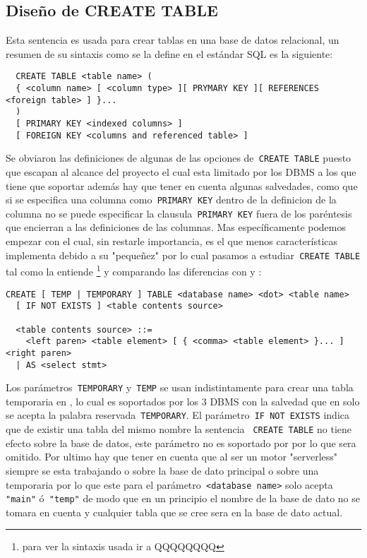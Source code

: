\subsection{Diseño de CREATE TABLE}
Esta sentencia es usada para crear tablas en una base de datos relacional, un resumen de su sintaxis como se la define en el estándar SQL es la siguiente:
\begin{Verbatim}
  CREATE TABLE <table name> (
  { <column name> [ <column type> ][ PRYMARY KEY ][ REFERENCES <foreign table> ] }...
  )
  [ PRIMARY KEY <indexed columns> ]
  [ FOREIGN KEY <columns and referenced table> ]
\end{Verbatim}
Se obviaron las definiciones de algunas de las opciones de\verb= CREATE TABLE= puesto que escapan al alcance del proyecto el cual esta limitado por los DBMS a los que tiene que soportar además hay que tener en cuenta algunas salvedades, como que si se especifica una columna como\verb= PRIMARY KEY= dentro de la definicion de la columna no se puede especificar la clausula\verb= PRIMARY KEY= fuera de los paréntesis que encierran a las definiciones de las columnas. Mas específicamente podemos empezar con \s el cual, sin restarle importancia, es el que menos características implementa debido a su "pequeñez" por lo cual pasamos a estudiar\verb= CREATE TABLE= tal como la entiende \s\footnote{para ver la sintaxis usada ir a QQQQQQQQ} y comparando las diferencias con \m y \p:

\begin{Verbatim}[frame=leftline, framesep=3mm]
  CREATE [ TEMP | TEMPORARY ] TABLE <database name> <dot> <table name> 
  [ IF NOT EXISTS ] <table contents source>

  <table contents source> ::=
    <left paren> <table element> [ { <comma> <table element> }... ] <right paren>
  | AS <select stmt>
\end{Verbatim}

Los parámetros\verb= TEMPORARY= y\verb= TEMP= se usan indistintamente para crear una tabla temporaria en \s, lo cual es soportados por los 3 DBMS con la salvedad que en \m solo se acepta la palabra reservada\verb= TEMPORARY=. El parámetro\verb= IF NOT EXISTS= indica que de existir una tabla del mismo nombre la sentencia \verb= CREATE TABLE= no tiene efecto sobre la base de datos, este parámetro no es soportado por \p por lo que sera omitido. Por ultimo hay que tener en cuenta que al ser \s un motor "serverless" siempre se esta trabajando o sobre la base de dato principal o sobre una temporaria por lo que este para el parámetro\verb= <database name>= solo acepta\verb= "main"= ó\verb= "temp"= de modo que en un principio el nombre de la base de dato no se tomara en cuenta y cualquier tabla que se cree sera en la base de dato actual.

